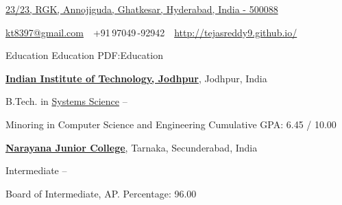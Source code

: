 \documentclass[letterpaper,MMMyyyy,nonstopmode]{simpleresumecv}
\newcommand{\CVAuthor}{K Tejas Reddy}
\newcommand{\CVWebpage}{http://tejasreddy9.github.io/}
\begin{document}

\Title{\CVAuthor}

\begin{SubTitle}
\href{https://www.google.com/maps/search/23\%2F23,+RGK,+Annojiguda,+Ghatkesar,+Hyderabad,+India+-+500088/@17.4290614,78.6564014,15z/data=!3m1!4b1}
{23/23, RGK, Annojiguda, Ghatkesar, Hyderabad, India - 500088}
\par
\href{mailto:kt8397@gmail.com}
{kt8397@gmail.com}
\,\SubBulletSymbol\,
+91\,97049\,-92942
\,\SubBulletSymbol\,
\href{\CVWebpage}
{\url{\CVWebpage}}
\end{SubTitle}

\begin{Body}


\Section
{Education}
{Education}
{PDF:Education}

\Entry
\href{http://www.iitj.ac.in/}
{\textbf{Indian Institute of Technology, Jodhpur}},
Jodhpur, India

\Gap
\BulletItem
B.Tech. in
\href{http://iitj.ac.in/focus_group/index.php?id=system_science}
{Systems Science}
\hfill
{} --


\begin{Detail}
\SubBulletItem
Minoring in Computer Science and Engineering
\SubBulletItem
Cumulative GPA: 6.45 / 10.00
\end{Detail}

\BigGap
\Entry
\href{http://www.narayanajuniorcolleges.com/}
{\textbf{Narayana Junior College}},
Tarnaka, Secunderabad, India

\Gap
\BulletItem
Intermediate
\hfill
{} --
\begin{Detail}
\SubBulletItem
Board of Intermediate, AP.
\SubBulletItem
Percentage: 96.00
\end{Detail}


\end{Body}
\end{document}
